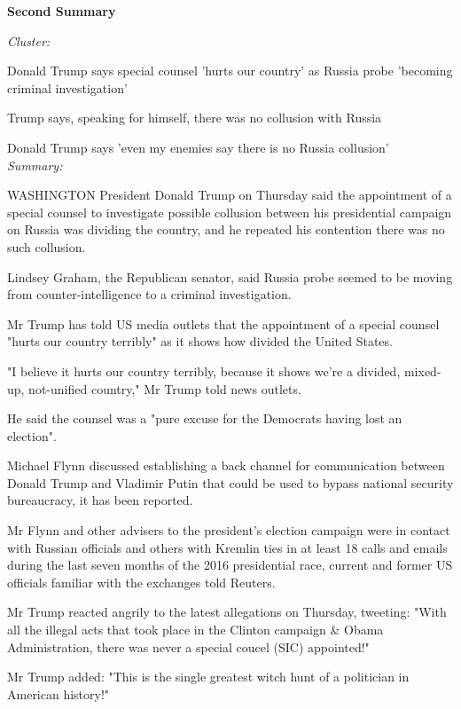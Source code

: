\documentclass[12pt]{article}
\begin{document}
\textbf{Second Summary}

\begin{mdframed}

\emph{Cluster:}

Donald Trump says special counsel 'hurts our country' as Russia probe 'becoming criminal investigation'

Trump says, speaking for himself, there was no collusion with Russia

Donald Trump says 'even my enemies say there is no Russia collusion' \\

\emph{Summary:}

WASHINGTON President Donald Trump on Thursday said the appointment of a special counsel to investigate possible collusion between his presidential campaign on Russia was dividing the country, and he repeated his contention there was no such collusion.

Lindsey Graham, the Republican senator, said Russia probe seemed to be moving from counter-intelligence to a criminal investigation.

Mr Trump has told US media outlets that the appointment of a special counsel "hurts our country terribly" as it shows how divided the United States.

"I believe it hurts our country terribly, because it shows we're a divided, mixed-up, not-unified country," Mr Trump told news outlets.

He said the counsel was a "pure excuse for the Democrats having lost an election".

Michael Flynn discussed establishing a back channel for communication between Donald Trump and Vladimir Putin that could be used to bypass national security bureaucracy,  it has been reported.

Mr Flynn and other advisers to the president's election campaign were in contact with Russian officials and others with Kremlin ties in at least 18 calls and emails during the last seven months of the 2016 presidential race, current and former US officials familiar with the exchanges told Reuters.

Mr Trump reacted angrily to the latest allegations on Thursday, tweeting: "With all the illegal acts that took place in the Clinton campaign \& Obama Administration, there was never a special coucel (SIC) appointed!"

Mr Trump added: "This is the single greatest witch hunt of a politician in American history!"


\end{mdframed}
\end{document}
